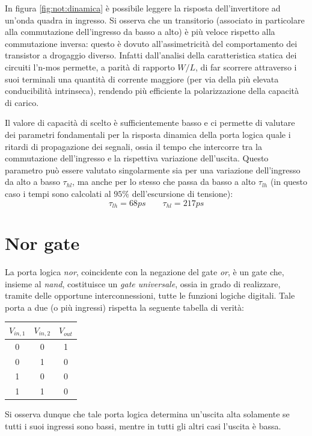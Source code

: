 		In figura \ref{fig:not:dinamica} è possibile leggere la risposta dell'invertitore ad un'onda quadra in ingresso. Si osserva che un transitorio (associato in particolare alla commutazione dell'ingresso da basso a alto) è più veloce rispetto alla commutazione inversa: questo è dovuto all'assimetricità del comportamento dei transistor a drogaggio diverso. Infatti dall'analisi della caratteristica statica dei circuiti l'n-mos permette, a parità di rapporto $W/L$, di far scorrere attraverso i suoi terminali una quantità di corrente maggiore (per via della più elevata conducibilità intrinseca), rendendo più efficiente la polarizzazione della capacità di carico.
		
		Il valore di capacità di scelto è sufficientemente basso e ci permette di valutare dei parametri fondamentali per la risposta dinamica della porta logica quale i ritardi di propagazione dei segnali, ossia il tempo che intercorre tra la commutazione dell'ingresso e la rispettiva variazione dell'uscita. Questo parametro può essere valutato singolarmente sia per una variazione dell'ingresso da alto a basso $\tau_{hl}$, ma anche per lo stesso che passa da basso a alto $\tau_{lh}$ (in questo caso i tempi sono calcolati al $95\%$ dell'escursione di tensione):
		\[ \tau_{lh} = 68ps \qquad \tau_{hl} = 217ps  \] 



\section{Nor gate}
	La porta logica \textit{nor}, coincidente con la negazione del gate \textit{or}, è un gate che, insieme al \textit{nand}, costituisce un \textit{gate universale}, ossia in grado di realizzare, tramite delle opportune interconnessioni, tutte le funzioni logiche digitali. Tale porta a due (o più ingressi) rispetta la seguente tabella di verità:
	\begin{center}
		\begin{tabular}{c c | c}
			$V_{in,1}$ & $V_{in,2}$ & $V_{out}$ \\ \hline
			0 & 0 & 1 \\
			0 & 1 & 0 \\
			1 & 0 & 0 \\
			1 & 1 & 0 \\
		\end{tabular}
	\end{center}
	Si osserva dunque che tale porta logica determina un'uscita alta solamente se tutti i suoi ingressi sono bassi, mentre in tutti gli altri casi l'uscita è bassa.
	
